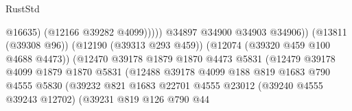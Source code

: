 \begin{lexlean}{RustStd}
\begin{coremodule}
                                                              @16635)
                                                            (@12166 @39282 @4099)))))
                                                    @34897
                                                    @34900
                                                    @34903
                                                    @34906))
                                                (@13811 (@39308 @96))
                                                (@12190 (@39313 @293 @459))
                                                (@12074 (@39320 @459 @100 @4688 @4473))
                                                (@12470
                                                  @39178
                                                  @1879
                                                  @1870
                                                  @4473
                                                  @5831
                                                  (@12479
                                                    @39178
                                                    @4099
                                                    @1879
                                                    @1870
                                                    @5831
                                                    (@12488
                                                      @39178
                                                      @4099
                                                      @188
                                                      @819
                                                      @1683
                                                      @790
                                                      @4555
                                                      @5830
                                                      (@39232
                                                        @821
                                                        @1683
                                                        @22701
                                                        @4555
                                                        @23012
                                                        (@39240 @4555 @39243 @12702)
                                                        (@39231
                                                          @819
                                                          @126
                                                          @790
                                                          @44

\end{coremodule}
\end{lexlean}
